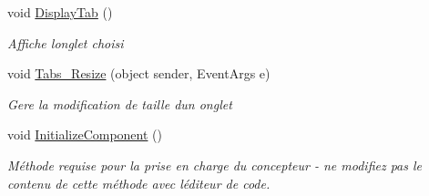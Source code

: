 \begin{DoxyCompactItemize}
void \mbox{\hyperlink{class_m_t_connect_agent_1_1_form_main_aea0155e69bf10a220151c5f3ff4e07c8}{Display\+Tab}} ()
\begin{DoxyCompactList}\small\item\em Affiche l\textquotesingle{}onglet choisi \end{DoxyCompactList}\item 
void \mbox{\hyperlink{class_m_t_connect_agent_1_1_form_main_aac4a1cf234165d7c9c0b0c4691a88f8d}{Tabs\+\_\+\+Resize}} (object sender, Event\+Args e)
\begin{DoxyCompactList}\small\item\em Gere la modification de taille d\textquotesingle{}un onglet \end{DoxyCompactList}\item 
void \mbox{\hyperlink{class_m_t_connect_agent_1_1_form_main_adcf40eec3a3bf56148d6cd5fbdeda2c5}{Initialize\+Component}} ()
\begin{DoxyCompactList}\small\item\em Méthode requise pour la prise en charge du concepteur -\/ ne modifiez pas le contenu de cette méthode avec l\textquotesingle{}éditeur de code. \end{DoxyCompactList}\end{DoxyCompactItemize}
